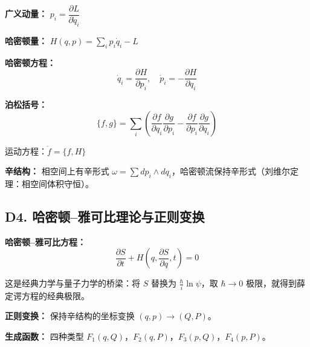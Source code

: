 \textbf{广义动量：} $p_i = \dfrac{\partial L}{\partial \dot{q}_i}$

\textbf{哈密顿量：} $H(q, p) = \displaystyle\sum_i p_i \dot{q}_i - L$

\textbf{哈密顿方程：}
\[
\dot{q}_i = \frac{\partial H}{\partial p_i}, \quad \dot{p}_i = -\frac{\partial H}{\partial q_i}
\]

\textbf{泊松括号：}
\[
\{f, g\} = \sum_i \left(\frac{\partial f}{\partial q_i}\frac{\partial g}{\partial p_i} - \frac{\partial f}{\partial p_i}\frac{\partial g}{\partial q_i}\right)
\]

运动方程：$\dot{f} = \{f, H\}$

\textbf{辛结构：} 相空间上有辛形式 $\omega = \sum dp_i \wedge dq_i$，哈密顿流保持辛形式（刘维尔定理：相空间体积守恒）。

\subsection{D4. 哈密顿--雅可比理论与正则变换}

\textbf{哈密顿--雅可比方程：}
\[
\frac{\partial S}{\partial t} + H\left(q, \frac{\partial S}{\partial q}, t\right) = 0
\]

这是经典力学与量子力学的桥梁：将 $S$ 替换为 $\frac{\hbar}{i}\ln\psi$，取 $\hbar \to 0$ 极限，就得到薛定谔方程的经典极限。

\textbf{正则变换：} 保持辛结构的坐标变换 $(q,p) \to (Q,P)$。

\textbf{生成函数：} 四种类型 $F_1(q,Q)$，$F_2(q,P)$，$F_3(p,Q)$，$F_4(p,P)$。